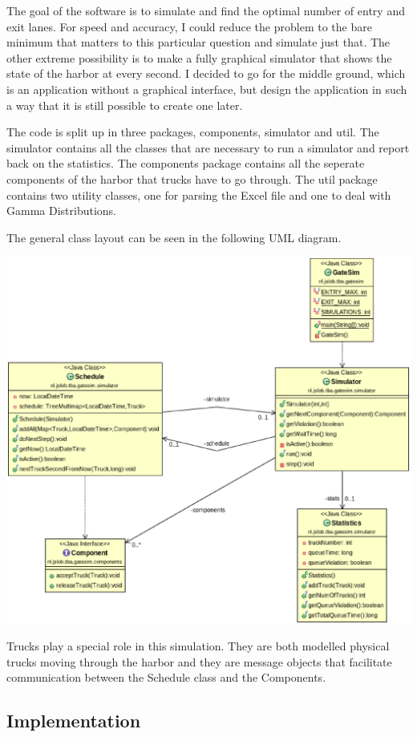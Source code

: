 \documentclass{article}
\begin{document}
The goal of the software is to simulate and find the optimal number of
entry and exit lanes. For speed and accuracy, I could reduce the
problem to the bare minimum that matters to this particular question
and simulate just that. The other extreme possibility is to make a
fully graphical simulator that shows the state of the harbor at every
second. I decided to go for the middle ground, which is an application
without a graphical interface, but design the application in such a
way that it is still possible to create one later.

The code is split up in three packages, components, simulator and
util. The simulator contains all the classes that are necessary to run
a simulator and report back on the statistics. The components package
contains all the seperate components of the harbor that trucks have to
go through. The util package contains two utility classes, one for
parsing the Excel file and one to deal with Gamma Distributions.

The general class layout can be seen in the following UML diagram.

\includegraphics[scale=0.4]{Simulator.eps}

Trucks play a special role in this simulation. They are both modelled
physical trucks moving through the harbor and they are message objects
that facilitate communication between the Schedule class and the
Components.

\subsection{Implementation}
\end{document}
